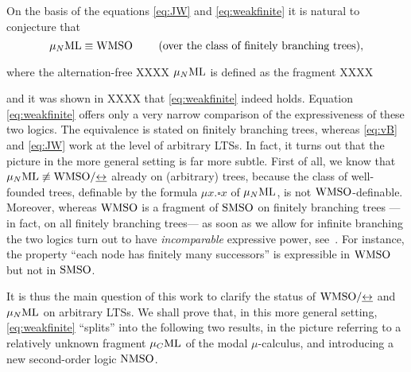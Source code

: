 On the basis of the equations \eqref{eq:JW} and \eqref{eq:weakfinite} it is 
natural to conjecture that 
\begin{equation}
\label{eq:weakfinite}
\AFMC \equiv \wmso  \qquad  \text{ (over the class of finitely branching trees)},
\end{equation}
\btbs
\item where the alternation-free XXXX $\mu_{N}\mathrm{ML}$ is defined as the 
fragment XXXX
\item and it was shown in XXXX that \eqref{eq:weakfinite} indeed holds.
\etbs
Equation \eqref{eq:weakfinite} offers only a very narrow comparison of the
expressiveness of these two logics. 
The equivalence is stated on finitely branching trees, whereas \eqref{eq:vB} and
\eqref{eq:JW} work at the level of arbitrary LTSs. 
In fact, it turns out that the picture in the more general setting is far more
subtle. 
First of all, we know that $\mu_{N}\mathrm{ML} \not\equiv \mathrm{WMSO}/{\mathrel{\underline{\leftrightarrow}}}$ already on (arbitrary) trees, because the class of well-founded trees, definable by the formula $\mu x.\square x$ of $\mu_{N}\mathrm{ML}$, is not $\mathrm{WMSO}$-definable. 
Moreover, whereas $\mathrm{WMSO}$ is a fragment of $\mathrm{SMSO}$ on finitely branching trees ---in fact, 
on all finitely branching trees--- as soon as we allow for infinite branching 
the two logics turn out to have \emph{incomparable} expressive power, 
see~\cite{CateF11,Zanasi:Thesis:2012}. 
For instance, the property ``each node has finitely many successors'' is 
expressible in $\mathrm{WMSO}$ but not in $\mathrm{SMSO}$.

It is thus the main question of this work to clarify the status of 
$\mathrm{WMSO}/{\mathrel{\underline{\leftrightarrow}}}$ and $\mu_{N}\mathrm{ML}$ on arbitrary LTSs. 
We shall prove that, in this more general setting, \eqref{eq:weakfinite}
``splits'' into the following two results, in the picture referring to a 
relatively unknown fragment $\mu_{C}\mathrm{ML}$ of the modal $\mu$-calculus, and 
introducing a new second-order logic $\mathrm{NMSO}$.

